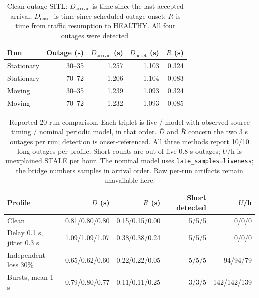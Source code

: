 \documentclass[11pt,a4paper]{article}
\newcommand{\code}[1]{\texttt{#1}}
\begin{document}
\begin{table}[htbp]
\centering\small
\begin{tabular}{@{}lrrrr@{}}
\toprule
Run & Outage (s) & $D_{\mathrm{arrival}}$ (s) & $D_{\mathrm{onset}}$ (s) & $R$ (s) \\
\midrule
Stationary & 30--35 & 1.257 & 1.103 & 0.324 \\
Stationary & 70--72 & 1.206 & 1.104 & 0.083 \\
Moving & 30--35 & 1.239 & 1.093 & 0.324 \\
Moving & 70--72 & 1.232 & 1.093 & 0.085 \\
\bottomrule
\end{tabular}
\caption{Clean-outage SITL: $D_{\mathrm{arrival}}$ is time since the last
accepted arrival; $D_{\mathrm{onset}}$ is time since scheduled outage onset;
$R$ is time from traffic resumption to HEALTHY. All four outages were detected.}
\label{tab:clean-sitl}
\end{table}

\begin{table}[htbp]
\centering\small
\setlength{\tabcolsep}{4pt}
\begin{tabular}{@{}p{28mm}rrrr@{}}
\toprule
Profile & $\bar D$ (s) & $\bar R$ (s) & Short detected & $U$/h \\
\midrule
Clean & 0.81/0.80/0.80 & 0.15/0.15/0.00 & 5/5/5 & 0/0/0 \\
Delay 0.1 s, jitter 0.3 s & 1.09/1.09/1.07 & 0.38/0.38/0.24 & 5/5/5 & 0/0/0 \\
Independent loss 30\% & 0.65/0.62/0.60 & 0.22/0.22/0.05 & 5/5/5 & 94/94/79 \\
Bursts, mean 1 s & 0.79/0.80/0.77 & 0.11/0.11/0.25 & 3/3/5 & 142/142/139 \\
\bottomrule
\end{tabular}
\caption{Reported 20-run comparison. Each triplet is live / model with
observed source timing / nominal periodic model, in that order.
$\bar D$ and $\bar R$ concern the two 3 s outages per run; detection is
onset-referenced. All three methods report 10/10 long outages per profile.
Short counts are out of five 0.8 s outages; $U$/h is unexplained STALE per hour.
The nominal model uses \code{late\_samples=liveness}; the bridge numbers
samples in arrival order. Raw per-run artifacts remain unavailable here.}
\label{tab:live-model}
\end{table}
\end{document}
